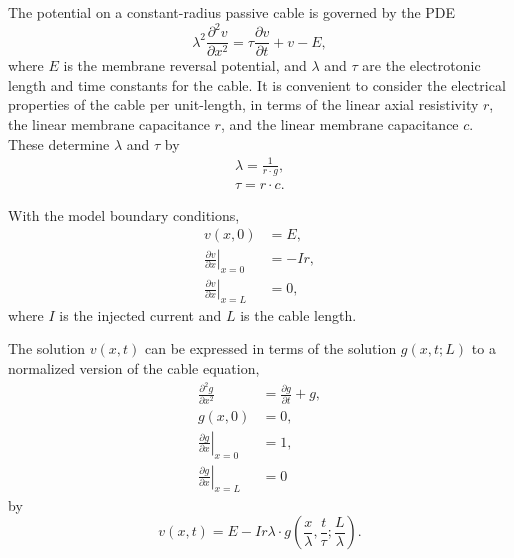 \documentclass[parskip=half]{scrartcl}
\begin{document}
The potential on a constant-radius passive cable is governed by the PDE
\begin{equation}
    \lambda^2 \frac{\partial^2 v}{\partial x^2} =
    \tau\frac{\partial v}{\partial t} + v - E,
\end{equation}
where $E$ is the membrane reversal potential, and $\lambda$ and $\tau$ are the
electrotonic length and time constants for the cable. It is convenient
to consider the electrical properties of the cable per unit-length, in terms
of the linear axial resistivity $r$, the linear membrane capacitance $r$,
and the linear membrane capacitance $c$. These determine $\lambda$ and $\tau$ by
\begin{gather*}
    \lambda = \frac{1}{r\cdot g},\\
    \tau = r\cdot c.
\end{gather*}

With the model boundary conditions,
\begin{subequations}
    \begin{align}
        v(x, 0) &= E, \\
        \left.\frac{\partial v}{\partial x}\right\vert_{x=0} & = -Ir, \\
         \left.\frac{\partial v}{\partial x}\right\vert_{x=L} & = 0,
    \end{align}
\end{subequations}
where $I$ is the injected current and $L$ is the cable length.

The solution $v(x, t)$ can be expressed in terms of the solution $g(x, t; L)$
to a normalized version of the cable equation,
\begin{subequations}
    \begin{align}
        \label{eq:normcable}
        \frac{\partial^2 g}{\partial x^2} & =
        \frac{\partial g}{\partial t} + g,
        \\
        \label{eq:normcableinitial}
        g(x, 0) &= 0,
        \\
        \label{eq:normcableleft}
        \left.\frac{\partial g}{\partial x}\right\vert_{x=0} & = 1,
        \\
        \label{eq:normcableright}
        \left.\frac{\partial g}{\partial x}\right\vert_{x=L} & = 0
    \end{align}
\end{subequations}
by
\begin{equation}
    v(x, t)= E - Ir\lambda \cdot g(\frac{x}{\lambda}, \frac{t}{\tau};  \frac{L}{\lambda}).
\end{equation}
\end{document}
